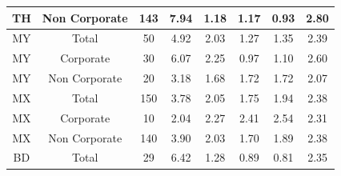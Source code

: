 {\begin{table}[ht]
{{\begin{tabular}{cccccccc}
                TH & Non Corporate & 143 & 7.94 & 1.18 & 1.17 & 0.93 & 2.80\\                                                                                                                                                      
                \midrule                                                                                                                                                                                                           
                MY & Total & 50 & 4.92 & 2.03 & 1.27 & 1.35 & 2.39\\                                                                                                                                                               
                MY & Corporate & 30 & 6.07 & 2.25 & 0.97 & 1.10 & 2.60\\                                                                                                                                                           
                MY & Non Corporate & 20 & 3.18 & 1.68 & 1.72 & 1.72 & 2.07\\                                                                                                                                                       
                \midrule                                                                                                                                                                                                           
                MX & Total & 150 & 3.78 & 2.05 & 1.75 & 1.94 & 2.38\\                                                                                                                                                              
                MX & Corporate & 10 & 2.04 & 2.27 & 2.41 & 2.54 & 2.31\\                                                                                                                                                           
                MX & Non Corporate & 140 & 3.90 & 2.03 & 1.70 & 1.89 & 2.38\\                                                                                                                                                      
                \midrule                                                                                                                                                                                                           
                BD & Total & 29 & 6.42 & 1.28 & 0.89 & 0.81 & 2.35\\                                                                                                                                                               

\end{tabular}}}
\end{table}}
